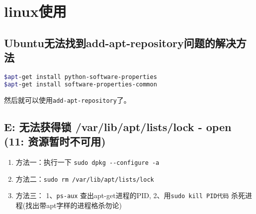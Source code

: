 \documentclass[cyan]{elegantnote}
\author{狼剩子}
\begin{document}
\maketitle
\tableofcontents
\chapter{linux使用}
\section{Ubuntu无法找到add-apt-repository问题的解决方法}
\begin{lstlisting}[caption=bash commands,language=bash]
$apt-get install python-software-properties 
$apt-get install software-properties-common 
\end{lstlisting}
然后就可以使用\verb!add-apt-repository!了。

\section{E: 无法获得锁 /var/lib/apt/lists/lock - open (11: 资源暂时不可用)}

\begin{enumerate}
\item ​方法一：执行一下 \verb!sudo dpkg --configure -a!
\item 方法二：\verb!sudo rm /var/lib/apt/lists/lock!
\item 方法三：
1、\verb!ps-aux! 查出apt-get进程的PID,
2、用\verb!sudo kill PID代码! 杀死进程(找出带apt字样的进程格杀勿论)
\end{enumerate}
\end{document}
